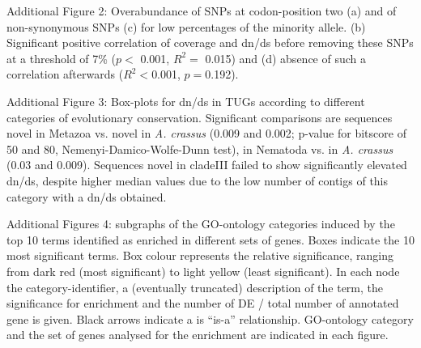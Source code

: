 \documentclass[10pt]{bmc_article}
\newenvironment{bmcformat}{\begin{raggedright}\baselineskip20pt\sloppy\setboolean{publ}{false}}{\end{raggedright}\baselineskip20pt\sloppy}
\begin{document}
\begin{bmcformat}
Additional Figure 2: 
Overabundance of SNPs at codon-position two (a) and of non-synonymous
SNPs (c) for low percentages of the minority allele. (b) Significant
positive correlation of coverage and dn/ds before removing these SNPs
at a threshold of 7\% ($p<$ 0.001, $R^2=$
0.015) and (d) absence of such a
correlation afterwards ($R^2<$0.001,
$p=$0.192).

Additional Figure 3: Box-plots for dn/ds in TUGs according to
different categories of evolutionary conservation. Significant
comparisons are sequences novel in Metazoa vs. novel in
\textit{A. crassus} (0.009 and 0.002; p-value for bitscore of 50 and
80, Nemenyi-Damico-Wolfe-Dunn test), in Nematoda vs. in
\textit{A. crassus} (0.03 and 0.009). Sequences novel in cladeIII
failed to show significantly elevated dn/ds, despite higher median
values due to the low number of contigs of this category with a dn/ds
obtained.

Additional Figures 4: subgraphs of the GO-ontology categories induced
by the top 10 terms identified as enriched in different sets of
genes. Boxes indicate the 10 most significant terms. Box colour
represents the relative significance, ranging from dark red (most
significant) to light yellow (least significant). In each node the
category-identifier, a (eventually truncated) description of the term,
the significance for enrichment and the number of DE / total number of
annotated gene is given. Black arrows indicate a is ``is-a''
relationship. GO-ontology category and the set of genes analysed for
the enrichment are indicated in each figure.

\end{bmcformat}
\end{document}
